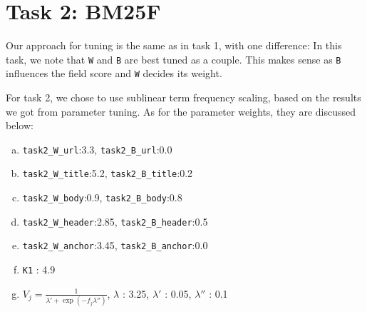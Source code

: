 \documentclass[10pt,twocolumn]{article}
\begin{document}
\section*{Task 2: BM25F}
Our approach for tuning is the same as in task 1, with one difference: In this task, we note that \texttt{W} and \texttt{B} are best tuned as a couple. This makes sense as \texttt{B} influences the field score and \texttt{W} decides its weight. 

For task 2, we chose to use sublinear term frequency scaling, based on the results we got from parameter tuning. As for the parameter weights, they are discussed below:
\begin{enumerate}[(a)]
\item \texttt{task2\_W\_url}:3.3, \texttt{task2\_B\_url}:0.0

\item \texttt{task2\_W\_title}:5.2, \texttt{task2\_B\_title}:0.2

\item \texttt{task2\_W\_body}:0.9, \texttt{task2\_B\_body}:0.8

\item \texttt{task2\_W\_header}:2.85, \texttt{task2\_B\_header}:0.5

\item \texttt{task2\_W\_anchor}:3.45, \texttt{task2\_B\_anchor}:0.0

\item \texttt{K1} : 4.9
\item $V_j = \frac{1}{\lambda'+\exp({-f_j\lambda''})}$, \texttt{$\lambda$} : 3.25, \texttt{$\lambda'$} : 0.05, \texttt{$\lambda''$} : 0.1

\end{enumerate}
\end{document}

